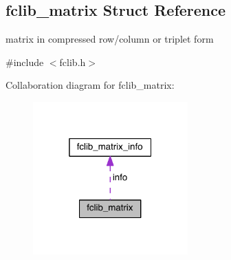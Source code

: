 \hypertarget{structfclib__matrix}{}\subsection{fclib\+\_\+matrix Struct Reference}
\label{structfclib__matrix}


matrix in compressed row/column or triplet form  




{\ttfamily \#include $<$fclib.\+h$>$}



Collaboration diagram for fclib\+\_\+matrix\+:
\nopagebreak
\begin{figure}[H]
\begin{center}
\leavevmode
\includegraphics[width=169pt]{structfclib__matrix__coll__graph}
\end{center}
\end{figure}
